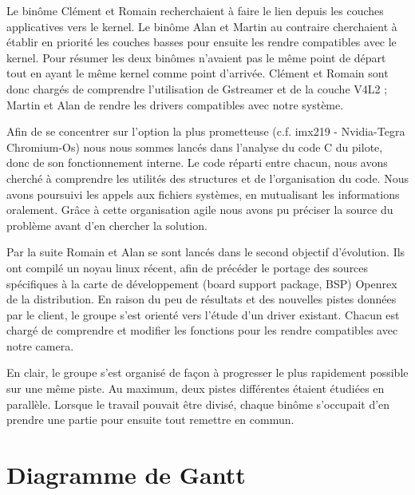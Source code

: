 Le binôme Clément et Romain recherchaient à faire le lien depuis les couches applicatives
vers le kernel. Le binôme Alan et Martin au contraire cherchaient à établir en priorité les
couches basses pour ensuite les rendre compatibles avec le kernel.
Pour résumer les deux binômes n’avaient pas le même point de départ tout en ayant le
même kernel comme point d’arrivée. Clément et Romain sont donc chargés de
comprendre l’utilisation de Gstreamer et de la couche V4L2 ; Martin et Alan de rendre les
drivers compatibles avec notre système.  \medskip

Afin de se concentrer sur l’option la plus prometteuse (c.f. imx219 - Nvidia-Tegra
Chromium-Os) nous nous sommes lancés dans l’analyse du code C du pilote, donc
de son fonctionnement interne. Le code réparti entre chacun, nous avons cherché à
comprendre les utilités des structures et de l’organisation du code. Nous
avons poursuivi les appels aux fichiers systèmes, en mutualisant les informations
oralement. Grâce à cette organisation agile nous avons pu préciser la source du problème
avant d’en chercher la solution.  \medskip

Par la suite Romain et Alan se sont lancés dans le second objectif d’évolution. Ils ont
compilé un noyau linux récent, afin de précéder le portage des sources spécifiques à la
carte de développement (board support package, BSP) Openrex de la distribution.
En raison du peu de résultats et des nouvelles pistes données par le client, le groupe s’est
orienté vers l’étude d’un driver existant. Chacun est chargé de comprendre et modifier les
fonctions pour les rendre compatibles avec notre camera.  \medskip

En clair, le groupe s'est organisé de façon à progresser le plus rapidement possible sur
une même piste. Au maximum, deux pistes différentes étaient étudiées en parallèle.
Lorsque le travail pouvait être divisé, chaque binôme s’occupait d’en prendre une partie
pour ensuite tout remettre en commun.

\section{Diagramme de Gantt}

